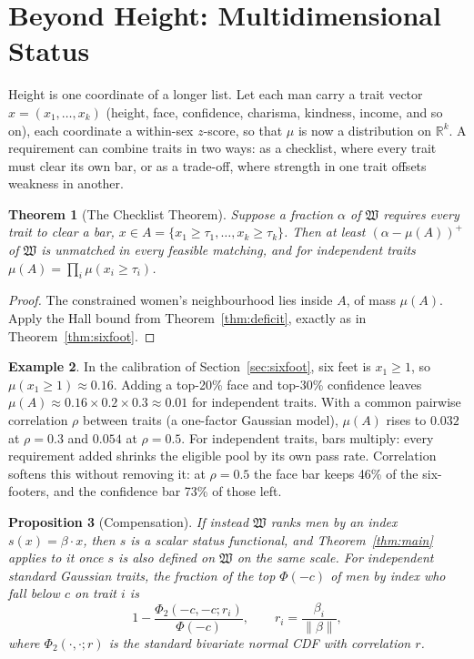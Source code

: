 \documentclass[11pt]{article}
\let\oldsection\section
\renewcommand{\section}{\Needspace{0.25\textheight}\oldsection}
\newtheorem{theorem}{Theorem}[section]
\newtheorem{proposition}[theorem]{Proposition}
\theoremstyle{definition}
\newtheorem{example}[theorem]{Example}
\theoremstyle{remark}
\newcommand{\W}{\mathfrak{W}}
\newcommand{\R}{\mathbb{R}}
\begin{document}
\section{Beyond Height: Multidimensional Status}\label{sec:multi}

Height is one coordinate of a longer list. Let each man carry a trait
vector $x = (x_1,\dots,x_k)$ (height, face, confidence, charisma,
kindness, income, and so on), each coordinate a within-sex $z$-score, so
that $\mu$ is now a distribution on $\R^k$. A requirement can combine
traits in two ways: as a checklist, where every trait must clear its own
bar, or as a trade-off, where strength in one trait offsets weakness in
another.

\begin{theorem}[The Checklist Theorem]\label{thm:checklist}
  Suppose a fraction $\alpha$ of $\W$ requires every trait to clear a
  bar, $x\in A = \{x_1\ge\tau_1,\dots,x_k\ge\tau_k\}$. Then at least
  $(\alpha-\mu(A))^+$ of $\W$ is unmatched in every feasible matching,
  and for independent traits $\mu(A) = \prod_i\mu(x_i\ge\tau_i)$.
\end{theorem}

\begin{proof}
  The constrained women's neighbourhood lies inside $A$, of mass
  $\mu(A)$. Apply the Hall bound from Theorem~\ref{thm:deficit}, exactly
  as in Theorem~\ref{thm:sixfoot}.
\end{proof}

\begin{example}
  In the calibration of Section~\ref{sec:sixfoot}, six feet is
  $x_1\ge1$, so $\mu(x_1\ge1)\approx0.16$. Adding a top-20\% face and
  top-30\% confidence leaves $\mu(A)\approx0.16\times0.2\times0.3
  \approx0.01$ for independent traits. With a common pairwise
  correlation $\rho$ between traits (a one-factor Gaussian model),
  $\mu(A)$ rises to $0.032$ at $\rho=0.3$ and $0.054$ at $\rho=0.5$.
  For independent traits, bars multiply: every requirement added
  shrinks the eligible pool by its own pass rate. Correlation softens
  this without removing it: at $\rho=0.5$ the face bar keeps 46\% of
  the six-footers, and the confidence bar 73\% of those left.
\end{example}

\begin{proposition}[Compensation]\label{prop:comp}
  If instead $\W$ ranks men by an index $s(x) = \beta\cdot x$, then $s$
  is a scalar status functional, and Theorem~\ref{thm:main} applies to
  it once $s$ is also defined on $\W$ on the same scale. For independent
  standard Gaussian traits, the fraction of the top $\Phi(-c)$ of men by
  index who fall below $c$ on trait $i$ is
  \begin{equation}
    1 - \frac{\Phi_2(-c,-c;r_i)}{\Phi(-c)}, \qquad r_i =
    \frac{\beta_i}{\|\beta\|},
  \end{equation}
  where $\Phi_2(\cdot,\cdot;r)$ is the standard bivariate normal CDF with
  correlation $r$.
\end{proposition}
\end{document}
